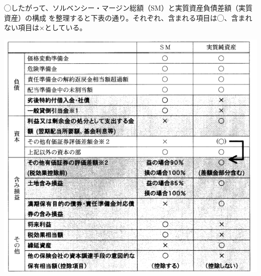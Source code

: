 \documentclass[report,gutter=10mm,fore-edge=10mm,uplatex,dvipdfmx]{jlreq}
\begin{document}
◯したがって、ソルベンシー・マージン総額（SM）と実質資産負債差額（実質資産）の構成
を整理すると下表の通り。それぞれ、含まれる項目は◯、含まれない項目は×としている。

\includegraphics[scale=0.8]{./images/ProbH16-2-3-SMandNetAsset.png}

\end{document}
